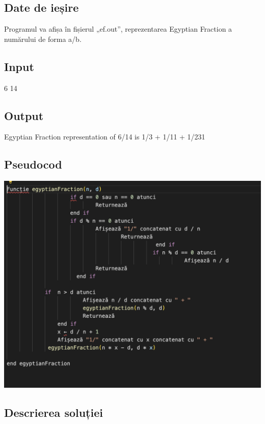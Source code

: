 \documentclass[runningheads]{llncs}
\begin{document}
\subsection{Date de ieșire}
Programul va afișa în fișierul „ef.out”, reprezentarea Egyptian Fraction a 				numărului de forma a/b.\newline

\subsection{Input}
6 14 \newline
\subsection{Output}

Egyptian Fraction representation of 6/14 is 1/3 + 1/11 + 1/231\newline

\subsection{Pseudocod}

\begin{center}
    \includegraphics[scale=0.6]{p2.png}
\end{center}

\subsection{Descrierea soluției}
\end{document}
